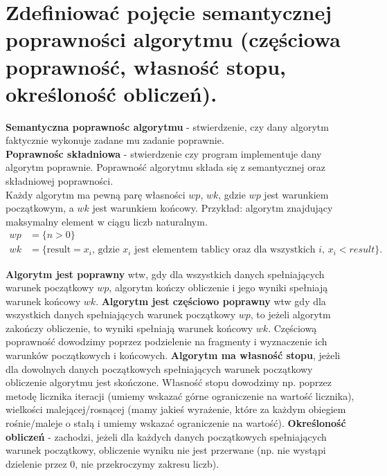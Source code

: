 \section{Zdefiniować pojęcie semantycznej poprawności algorytmu (częściowa poprawność, własność stopu, określoność obliczeń).}

\textbf{Semantyczna poprawnośc algorytmu} -
stwierdzenie, czy dany algorytm faktycznie wykonuje zadane mu zadanie poprawnie. \\
\textbf{Poprawnośc składniowa} - stwierdzenie czy program implementuje dany algorytm poprawnie.
Poprawność algorytmu składa się z semantycznej oraz składniowej poprawności. \\

Każdy algorytm ma pewną parę własności $wp$, $wk$, gdzie $wp$ jest warunkiem początkowym, a $wk$ jest warunkiem końcowy.
Przykład: algorytm znajdujący maksymalny element w ciągu liczb naturalnym.
\begin{align*}
    wp & = \{n > 0\} \\
    wk & = \{\text{result} = x_i\text{, gdzie }x_i\text{ jest elementem tablicy oraz dla wszystkich }i\text{, }x_i < result\}.
\end{align*}

\textbf{Algorytm jest poprawny} wtw, gdy dla wszystkich danych spełniających warunek początkowy $wp$,
algorytm kończy obliczenie i jego wyniki spełniają warunek końcowy $wk$.
\textbf{Algorytm jest częściowo poprawny} wtw gdy dla wszystkich danych spełniających warunek początkowy $wp$,
to jeżeli algorytm zakończy obliczenie, to wyniki spełniają warunek końcowy $wk$.
Częściową poprawność dowodzimy poprzez podzielenie na fragmenty i wyznaczenie ich warunków początkowych i końcowych.
\textbf{Algorytm ma własność stopu},
jeżeli dla dowolnych danych początkowych spełniających warunek początkowy obliczenie algorytmu jest skończone.
Własność stopu dowodzimy np. poprzez metodę licznika iteracji (umiemy wskazać górne ograniczenie na wartość licznika),
wielkości malejącej/rosnącej
(mamy jakieś wyrażenie, które za każdym obiegiem rośnie/maleje o stałą i umiemy wskazać ograniczenie na wartość).
\textbf{Określoność obliczeń} - zachodzi, jeżeli dla każdych danych początkowych spełniających warunek początkowy,
obliczenie wyniku nie jest przerwane (np. nie wystąpi dzielenie przez 0, nie przekroczymy zakresu liczb).

